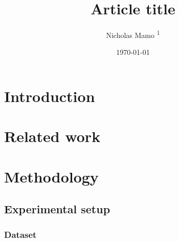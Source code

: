 \documentclass[twocolumn]{elegantarticle}
\title{Article title}
\author{Nicholas Mamo \textsuperscript{1}}
\date{\today}
\begin{document}
	\maketitle
	
	\section{Introduction}
	
		\lipsum[1-3]
	
	\section{Related work}
	
		\lipsum[4-8]
		
	\section{Methodology}
	
		\lipsum[9]
		
		\subsection{Experimental setup}
		
			\lipsum[10]
			
			\subsubsection{Dataset}
			
				\lipsum[11]
\end{document}
